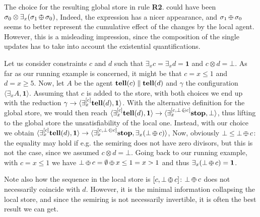 \documentclass{llncs}
\newcommand{\tell}{{\bf tell}}
\newcommand{\ostop}{{\bf stop}}
\def\monid{{\mathbf 0}}
\def\odiv{\, {\ominus\hspace{-7.7pt} \div} \,}
\def\monid{\mathbf{1}}
\begin{document}
\begin{remark}
The choice for the resulting global store in rule {\bf R2}. could have been 
$\sigma_0 \otimes \exists_x(\sigma_1 \odiv \sigma _0)$, 
Indeed, the expression has a nicer appearance,
%
and $\sigma_1 \odiv \sigma_0$ seems to better represent the cumulative effect of the
changes by the local agent.
However, this is a misleading impression, since the composition of the single updates
has to take into account the existential quantifications.

Let us consider constraints $c$ and $d$ such that $\exists_x c = \exists_x d = \monid$ and $c \otimes d = \bot$.
As far as our running example is concerned, it might be that $c = x \leq 1$ and $d = x \geq 5$. 
Now, let $A$ be the agent $\hbox{\tell}(c) \parallel \hbox{\tell}(d)$ and $\gamma$ the configuration 
$\langle \exists_x A, \monid \rangle$.
Assuming that $c$ is added to the store, with both choices we end up with the reduction
$\gamma \to \langle \exists_x^{[ c ]} \hbox{\tell}(d), \monid \rangle$.
With the alternative definition for the global store, we would then reach 
 $\langle \exists_x^{[c]} \hbox{\tell}(d), \monid \rangle \to \langle \exists_x^{[c,\bot \odiv c]} \hbox{\ostop}, \bot \rangle$,
 thus lifting to the global store the unsatisfiability of the local one.
 Instead, with our choice we obtain 
 $\langle \exists_x^{[c]} \hbox{\tell}(d), \monid \rangle \to \langle \exists_x^{[c,\bot \odiv c]} \hbox{\ostop}, \exists_x (\bot \odiv c) \rangle$, 
Now, obviously $\bot \leq \bot \odiv c$: the equality may hold if e.g. the semiring does not have zero divisors, 
but this is not the case, since we assumed $c \otimes d = \bot$.
Going back to our running example, with $c = x \leq 1$ we have $\bot \odiv c = \emptyset \odiv x \leq 1 = x > 1$
and thus $\exists_x (\bot \odiv c) = \monid$.

Note also how the sequence in the local store is $[c,\bot \odiv c]$: $\bot \odiv c$ does not necessarily coincide with $d$.
However, it is the minimal information collapsing the local store, and since the semiring is not 
necessarily invertible, it is often the best result we can get.
\end{remark}
\end{document}
